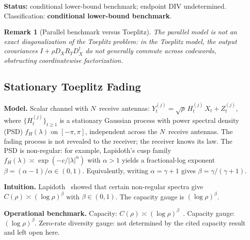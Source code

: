 \documentclass[lettersize,onecolumn]{IEEEtran}
\newtheorem{remark}{Remark}
\newcommand{\snr}{\rho}
\begin{document}
\textbf{Status:} conditional lower-bound benchmark; endpoint DIV
undetermined. Classification: \textbf{conditional lower-bound
benchmark}.

\begin{remark}[Parallel benchmark versus Toeplitz]
\label{rem:parallel_toeplitz}
The parallel model is not an exact diagonalization of the Toeplitz
problem: in the Toeplitz model, the output covariances
$I+\snr D_X R_T D_X^\dagger$ do not generally commute across
codewords, obstructing coordinatewise factorization.
\end{remark}

\subsection{Stationary Toeplitz Fading}\label{subsec:ch_toeplitz}

\textbf{Model.}
Scalar channel with $N$~receive antennas:
$Y_t^{(j)} = \sqrt{\snr}\,H_t^{(j)}\,X_t + Z_t^{(j)}$, where
$\{H_t^{(j)}\}_{t \ge 1}$ is a stationary Gaussian process with
power spectral density (PSD) $f_H(\lambda)$ on $[-\pi,\pi]$, independent across the
$N$~receive antennas. The fading process is not revealed to the
receiver; the receiver knows its law. The PSD is non-regular: for example, Lapidoth's cusp family
$f_H(\lambda) \asymp \exp(-c/|\lambda|^\alpha)$ with $\alpha > 1$
yields a fractional-log exponent
$\beta = (\alpha-1)/\alpha \in (0,1)$.
Equivalently, writing $\alpha = \gamma+1$ gives
$\beta = \gamma/(\gamma+1)$.

\textbf{Intuition.}
Lapidoth~\cite{Lapidoth2005} showed that certain non-regular spectra
give $C(\snr) \asymp (\log\snr)^\beta$ with
$\beta \in (0,1)$. The capacity gauge is
$(\log\snr)^\beta$.

\textbf{Operational benchmark.}
Capacity: $C(\snr) \asymp (\log\snr)^\beta$~\cite{Lapidoth2005}.
Capacity gauge: $(\log\snr)^\beta$.
Zero-rate diversity gauge: not determined by the cited capacity
result and left open here.
\end{document}
